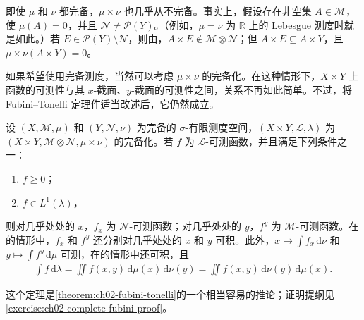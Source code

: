 \documentclass[../../main.tex]{subfiles}%
\begin{document}
\begin{remark}
即使 $\mu$ 和 $\nu$ 都完备，$\mu\times\nu$ 也几乎从不完备。事实上，假设存在非空集 $A\in\mathscr{M}$，使 $\mu(A)=0$，并且 $\mathscr{N}\ne\mathscr{P}(Y)$。（例如，$\mu=\nu$ 为 $\mathbb{R}$ 上的 Lebesgue 测度时就是如此。）若 $E\in\mathscr{P}(Y)\setminus\mathscr{N}$，则由，$A\times E\notin\mathscr{M}\otimes\mathscr{N}$；但 $A\times E\subseteq A\times Y$，且 $\mu\times\nu(A\times Y)=0$。
\end{remark}
如果希望使用完备测度，当然可以考虑 $\mu\times\nu$ 的完备化。在这种情形下，$X\times Y$ 上函数的可测性与其 $x$-截面、$y$-截面的可测性之间，关系不再如此简单。不过，将 Fubini--Tonelli 定理作适当改述后，它仍然成立。
\begin{theorem}\label{theorem:ch02-complete-fubini-tonelli}
设 $(X,\mathscr{M},\mu)$ 和 $(Y,\mathscr{N},\nu)$ 为完备的 $\sigma$-有限测度空间，$(X\times Y,\mathscr{L},\lambda)$ 为 $(X\times Y,\mathscr{M}\otimes\mathscr{N},\mu\times\nu)$ 的完备化。若 $f$ 为 $\mathscr{L}$-可测函数，并且满足下列条件之一：
\begin{enumerate}
\item\label{item:ch02-complete-tonelli} $f\ge0$；
\item\label{item:ch02-complete-fubini} $f\in L^1(\lambda)$，
\end{enumerate}
则对几乎处处的 $x$，$f_x$ 为 $\mathscr{N}$-可测函数；对几乎处处的 $y$，$f^y$ 为 $\mathscr{M}$-可测函数。在的情形中，$f_x$ 和 $f^y$ 还分别对几乎处处的 $x$ 和 $y$ 可积。此外，$x\mapsto\int f_x\,\mathrm{d}\nu$ 和 $y\mapsto\int f^y\,\mathrm{d}\mu$ 可测，在的情形中还可积，且
\begin{align*}
\int f\,\mathrm{d}\lambda=\iint f(x,y)\,\mathrm{d}\mu(x)\,\mathrm{d}\nu(y)
=\iint f(x,y)\,\mathrm{d}\nu(y)\,\mathrm{d}\mu(x).
\end{align*}
\end{theorem}
这个定理是\cref{theorem:ch02-fubini-tonelli}的一个相当容易的推论；证明提纲见\cref{exercise:ch02-complete-fubini-proof}。
\end{document}
